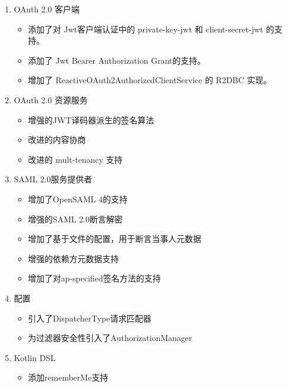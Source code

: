 \begin{enumerate}
  \item OAuth 2.0 客户端
        \begin{itemize}
          \item 添加了对 Jwt客户端认证中的 private-key-jwt 和 client-secret-jwt 的支持。
          \item 添加了 Jwt Bearer Authorization Grant的支持。
          \item 增加了 ReactiveOAuth2AuthorizedClientService 的 R2DBC 实现。
        \end{itemize}
  \item OAuth 2.0 资源服务
        \begin{itemize}
          \item 增强的JWT译码器派生的签名算法
          \item 改进的内容协商
          \item 改进的 mult-tenancy 支持
        \end{itemize}
  \item SAML 2.0服务提供者
        \begin{itemize}
          \item 增加了OpenSAML 4的支持
          \item 增强的SAML 2.0断言解密
          \item 增加了基于文件的配置，用于断言当事人元数据
          \item 增强的依赖方元数据支持
          \item 增加了对ap-specified签名方法的支持
        \end{itemize}
  \item 配置
        \begin{itemize}
          \item 引入了DispatcherType请求匹配器
          \item 为过滤器安全性引入了AuthorizationManager
        \end{itemize}
  \item Kotlin DSL
        \begin{itemize}
          \item 添加rememberMe支持
        \end{itemize}
\end{enumerate}

